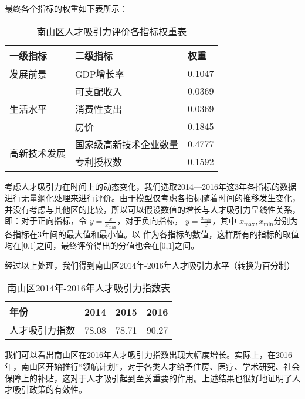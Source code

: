 \documentclass[withoutpreface,bwprint]{cumcmthesis} %
\begin{document}
最终各个指标的权重如下表所示：


\begin{table}[htbp]
  \centering
  \caption{南山区人才吸引力评价各指标权重表}
    \begin{tabular}{lp{12.665em}l}
    \toprule
    \multicolumn{1}{p{6em}}{一级指标} & 二级指标 & \multicolumn{1}{p{5.25em}}{权重} \\
    \midrule
    \multicolumn{1}{p{6em}}{发展前景} & GDP增长率 & 0.1047 \\
    \multicolumn{1}{l}{\multirow{3}[0]{*}{生活水平}} & 可支配收入 & 0.0369 \\
      & 消费性支出 & 0.0369 \\
      & 房价 & 0.1845 \\
    \multicolumn{1}{l}{\multirow{2}[1]{*}{高新技术发展}} & 国家级高新技术企业数量 & 0.4777 \\
      & 专利授权数 & 0.1592 \\
    \bottomrule
    \end{tabular}%
  \label{tab:南山区人才吸引力评价各指标权重表}%
\end{table}%
   
考虑人才吸引力在时间上的动态变化，我们选取2014—2016年这3年各指标的数据进行无量纲化处理来进行评价。由于模型仅考虑各指标随着时间的推移发生变化，并没有考虑与其他区的比较，所以可以假设数值的增长与人才吸引力呈线性关系，即：对于正向指标，令  $y = \frac{x}{{{x_{\max }}}}$，对于负向指标，  $y = \frac{{{x_{\min }}}}{x}$，其中 ${x_{\max }},{x_{\min }}$分别为各指标在3年间的最大值和最小值。以 作为各指标的数值，这样所有的指标的取值均在[0,1]之间，最终评价得出的分值也会在[0,1]之间。

经过以上处理，我们得到南山区2014年-2016年人才吸引力水平（转换为百分制）
\begin{table}[htbp]
  \centering
  \caption{南山区2014年-2016年人才吸引力指数表}
    \begin{tabular}{|p{7.335em}|c|c|c|}
    \toprule
    年份 & 2014 & 2015 & 2016 \\
    \midrule
    人才吸引力指数 & 78.08 & 78.71 & 90.27 \\
    \bottomrule
    \end{tabular}%
  \label{tab:南山区2014年-2016年人才吸引力指数表}%
\end{table}%

  
我们可以看出南山区在2016年人才吸引力指数出现大幅度增长。实际上，在2016年，南山区开始推行“领航计划”，对于各类人才给予住房、医疗、学术研究、社会保障上的补贴，这对于人才吸引起到至关重要的作用。上述结果也很好地证明了人才吸引政策的有效性。
\end{document}
